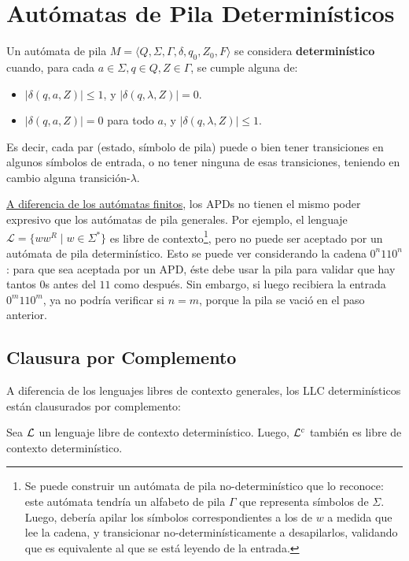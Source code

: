 \section{Autómatas de Pila Determinísticos}

Un autómata de pila $M = \langle Q, \Sigma, \Gamma, \delta, q_0, Z_0, F \rangle$ se considera \textbf{determinístico} cuando, para cada $a \in \Sigma, q \in Q, Z \in \Gamma$, se cumple alguna de:
\begin{itemize}
    \item $|\delta(q, a, Z)| \leq 1$, y $|\delta(q, \lambda, Z)| = 0$.
    \item $|\delta(q, a, Z)| = 0$ para todo $a$, y $|\delta(q, \lambda, Z)| \leq 1$.
\end{itemize}

Es decir, cada par (estado, símbolo de pila) puede o bien tener transiciones en algunos símbolos de entrada, o no tener ninguna de esas transiciones, teniendo en cambio alguna transición-$\lambda$.

\hyperref[equivalencia-afd-afnd]{A diferencia de los autómatas finitos}, los APDs no tienen el mismo poder expresivo que los autómatas de pila generales. Por ejemplo, el lenguaje $\mathcal L = \{ww^R \mid w \in \Sigma^*\}$ es libre de contexto\footnote{Se puede construir un autómata de pila no-determinístico que lo reconoce: este autómata tendría un alfabeto de pila $\Gamma$ que representa símbolos de $\Sigma$. Luego, debería apilar los símbolos correspondientes a los de $w$ a medida que lee la cadena, y transicionar no-determinísticamente a desapilarlos, validando que es equivalente al que se está leyendo de la entrada.}, pero no puede ser aceptado por un autómata de pila determinístico. Esto se puede ver considerando la cadena $0^n 11 0^n$: para que sea aceptada por un APD, éste debe usar la pila para validar que hay tantos $0$s antes del $11$ como después. Sin embargo, si luego recibiera la entrada $0^m 11 0^m$, ya no podría verificar si $n = m$, porque la pila se vació en el paso anterior.

\subsection{Clausura por Complemento}

A diferencia de los lenguajes libres de contexto generales, los LLC determinísticos están clausurados por complemento:

\begin{theorem*}
    Sea $\mathcal{L}$ un lenguaje libre de contexto determinístico. Luego, $\mathcal{L}^c$ también es libre de contexto determinístico.
\end{theorem*}

